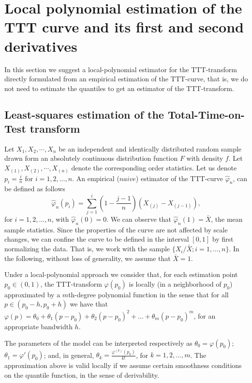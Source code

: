 \documentclass[preprint,12pt]{elsarticle}
\begin{document}
%
\section{Local polynomial estimation of the TTT curve and its first and second derivatives}
\noindent In this section we suggest a local-polynomial estimator for the TTT-transform directly formulated from an empirical estimation of the TTT-curve, that is, we do not need to estimate the quantiles to get an estimator of the TTT-transform.
%
\subsection{Least-squares estimation of the Total-Time-on-Test transform}
\noindent Let $X_1,X_2,\cdots,X_n$ be an independent and identically distributed random sample drawn form an absolutely continuous distribution function $F$ with density $f$. Let $X_{(1)},X_{(2)},\cdots,X_{(n)}$ denote the corresponding order statistics. Let us denote $p_i=\frac{i}{n}$ for $i= 1,2, \ldots, n$. An empirical ($naive$) estimator of the TTT-curve $\widehat{\varphi}_n$, can be defined as follows
%
\begin{equation}\label{empi}
\widehat{\varphi}_n\left(p_i\right)= \sum_{j=1}^i \left(1-\frac{j-1}{n}\right) \left(X_{(j)}-X_{(j-1)}\right),
\end{equation}
for $i=1,2,\ldots,n$, with $\widehat{\varphi}_n(0)=0$. We can observe that $\widehat{\varphi}_n(1)=\bar{X}$, the mean sample statistics. Since the properties of the curve are not affected by scale changes, we can confine the curve to be defined in the interval $[0,1]$ by first normalizing the data. That is, we work with the sample $\{X_i/\bar{X}; i=1,\ldots,n\}$. In the following, without loss of generality, we assume that $\bar{X}=1$.

Under a local-polynomial approach we consider that, for each estimation point $p_0 \in (0,1)$, the TTT-transform $\varphi(p_0)$ is locally (in a neighborhood of $p_0$) approximated by a $m$th-degree polynomial function in the sense that for all $p \in \left(p_0-h,p_0+h\right)$ we have that $\varphi(p)=\theta_0+\theta_1(p-p_0)+\theta_2(p-p_0)^2+\ldots+\theta_m(p-p_0)^m$, for an appropriate bandwidth $h$. 

The parameters of the model can be interpreted respectively as $\theta_0={\varphi}(p_0)$; ${\theta}_1={\varphi'}(p_0)$; and, in general, ${\theta}_k=\frac{\varphi^{(k)}(p_0)}{k!}$, for $k=1,2,\ldots,m$. The approximation above is valid locally if we assume certain smoothness conditions on the quantile function, in the sense of derivability. 
\end{document}

